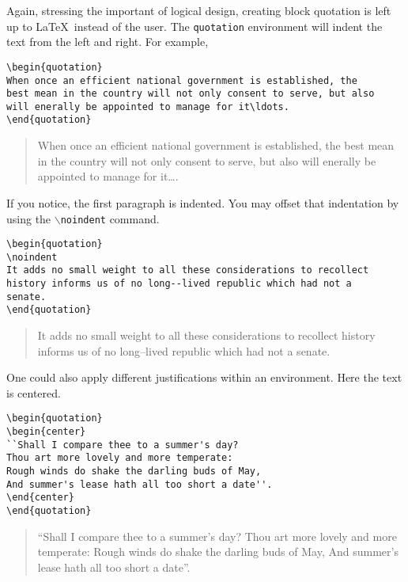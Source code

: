 \documentclass{article}
\begin{document}
Again, stressing the important of logical design, creating block quotation is left up to \LaTeX\ instead of the user. The \texttt{quotation} environment will indent the text from the left and right. For example,

\begin{verbatim}
\begin{quotation}
When once an efficient national government is established, the 
best mean in the country will not only consent to serve, but also
will enerally be appointed to manage for it\ldots.
\end{quotation}
\end{verbatim}
\begin{quotation}
When once an efficient national government is established, the 
best mean in the country will not only consent to serve, but also
will enerally be appointed to manage for it\ldots.
\end{quotation}

If you notice, the first paragraph is indented. You may offset that indentation by using the \texttt{$\backslash$noindent} command.
\begin{verbatim}
\begin{quotation}
\noindent
It adds no small weight to all these considerations to recollect
history informs us of no long--lived republic which had not a
senate. 
\end{quotation}
\end{verbatim}
\begin{quotation}
\noindent
It adds no small weight to all these considerations to recollect
history informs us of no long--lived republic which had not a
senate. 
\end{quotation}

One could also apply different justifications within an environment. Here the text is centered.
\begin{verbatim}
\begin{quotation}
\begin{center}
``Shall I compare thee to a summer's day?
Thou art more lovely and more temperate:
Rough winds do shake the darling buds of May,
And summer's lease hath all too short a date''.
\end{center}
\end{quotation}
\end{verbatim}
\begin{quotation}
\begin{center}
``Shall I compare thee to a summer's day?
Thou art more lovely and more temperate:
Rough winds do shake the darling buds of May,
And summer's lease hath all too short a date''.
\end{center}
\end{quotation}
\end{document}

